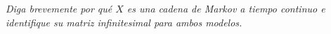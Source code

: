 \emph{
    Diga brevemente por qu\'e $X$ es una cadena de Markov a tiempo continuo e identifique 
    su matriz infinitesimal para ambos modelos.\pn
}
\afterstatement\pn